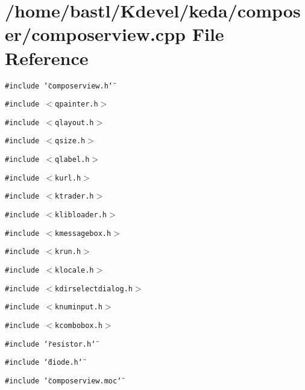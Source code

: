 \section{/home/bastl/Kdevel/keda/composer/composerview.cpp File Reference}
\label{composerview_8cpp}
{\tt \#include \char`\"{}composerview.h\char`\"{}}\par
{\tt \#include $<$qpainter.h$>$}\par
{\tt \#include $<$qlayout.h$>$}\par
{\tt \#include $<$qsize.h$>$}\par
{\tt \#include $<$qlabel.h$>$}\par
{\tt \#include $<$kurl.h$>$}\par
{\tt \#include $<$ktrader.h$>$}\par
{\tt \#include $<$klibloader.h$>$}\par
{\tt \#include $<$kmessagebox.h$>$}\par
{\tt \#include $<$krun.h$>$}\par
{\tt \#include $<$klocale.h$>$}\par
{\tt \#include $<$kdirselectdialog.h$>$}\par
{\tt \#include $<$knuminput.h$>$}\par
{\tt \#include $<$kcombobox.h$>$}\par
{\tt \#include \char`\"{}resistor.h\char`\"{}}\par
{\tt \#include \char`\"{}diode.h\char`\"{}}\par
{\tt \#include \char`\"{}composerview.moc\char`\"{}}\par
